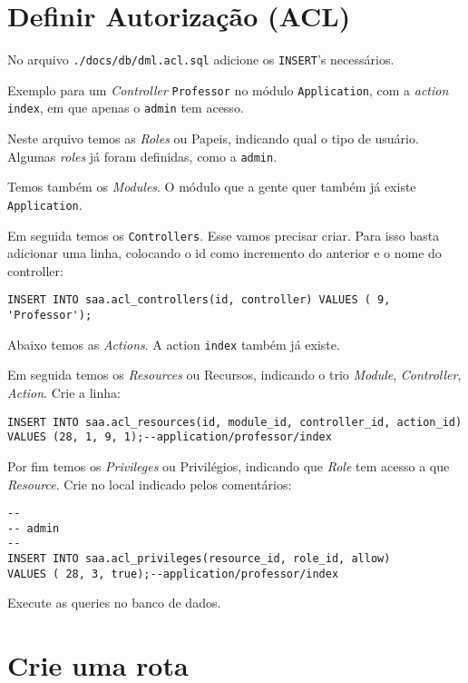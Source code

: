 \section{Definir Autorização (ACL)}\label{definir-autorizauxe7uxe3o-acl}

No arquivo \texttt{./docs/db/dml.acl.sql} adicione os \texttt{INSERT}'s
necessários.

Exemplo para um \emph{Controller} \texttt{Professor} no módulo
\texttt{Application}, com a \emph{action} \texttt{index}, em que apenas
o \texttt{admin} tem acesso.

Neste arquivo temos as \emph{Roles} ou Papeis, indicando qual o tipo de
usuário. Algumas \emph{roles} já foram definidas, como a \texttt{admin}.

Temos também os \emph{Modules}. O módulo que a gente quer também já
existe \texttt{Application}.

Em seguida temos os \texttt{Controllers}. Esse vamos precisar criar.
Para isso basta adicionar uma linha, colocando o id como incremento do
anterior e o nome do controller:

\begin{verbatim}
INSERT INTO saa.acl_controllers(id, controller) VALUES ( 9, 'Professor');
\end{verbatim}

Abaixo temos as \emph{Actions}. A action \texttt{index} também já
existe.

Em seguida temos os \emph{Resources} ou Recursos, indicando o trio
\emph{Module}, \emph{Controller}, \emph{Action}. Crie a linha:

\begin{verbatim}
INSERT INTO saa.acl_resources(id, module_id, controller_id, action_id)
VALUES (28, 1, 9, 1);--application/professor/index
\end{verbatim}

Por fim temos os \emph{Privileges} ou Privilégios, indicando que
\emph{Role} tem acesso a que \emph{Resource}. Crie no local indicado
pelos comentários:

\begin{verbatim}
-- 
-- admin
-- 
INSERT INTO saa.acl_privileges(resource_id, role_id, allow)
VALUES ( 28, 3, true);--application/professor/index
\end{verbatim}

Execute as queries no banco de dados.

\section{Crie uma rota}\label{crie-uma-rota}

